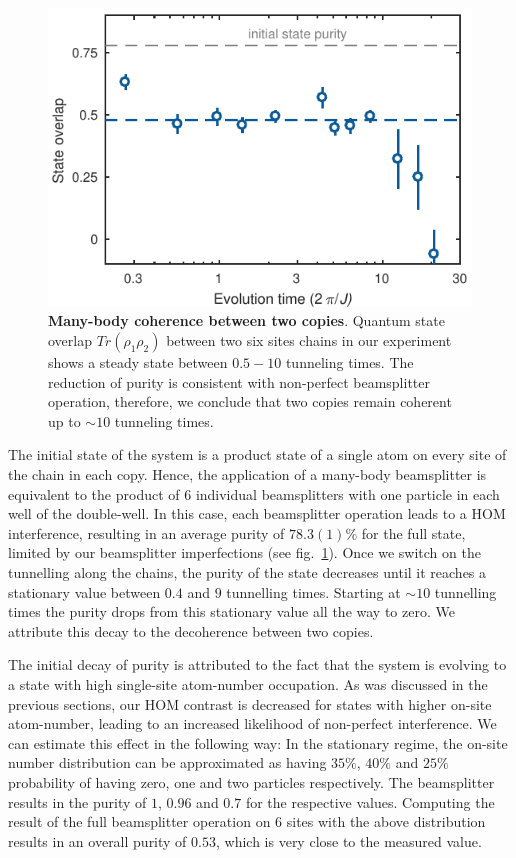 \begin{figure}[t]
	\centering
	\includegraphics[scale=1]{figures/CBH_MBP_single_trace.pdf}
	\caption{{\bf Many-body coherence between two copies}. Quantum state overlap $Tr(\rho_1 \rho_2) $ between two six sites chains in our experiment shows a steady state between $0.5-10$ tunneling times. The reduction of purity is consistent with non-perfect beamsplitter operation, therefore, we conclude that two copies remain coherent up to $\sim10$ tunneling times. }
	\label{fig:CBH_MBP_vs_time}
\end{figure}
\label{bs_imperfactions}
The initial state of the system is a product state of a single atom on every site of the chain in each copy. Hence, the application of a many-body beamsplitter is equivalent to the product of $6$ individual beamsplitters with one particle in each well of the double-well. In this case, each beamsplitter operation leads to a HOM interference, resulting in an average purity of $78.3(1)\%$ for the full state, limited by our beamsplitter imperfections (see fig.~\ref{fig:CBH_MBP_vs_time}). Once we switch on the tunnelling along the chains, the purity of the state decreases until it reaches a stationary value between $0.4$ and $ 9$ tunnelling times. Starting at $\sim 10$ tunnelling times the purity drops from this stationary value all the way to zero. We attribute this decay to the decoherence between two copies.

The initial decay of purity is attributed to the fact that the system is evolving to a state with high single-site atom-number occupation. As was discussed in the previous sections, our HOM contrast is decreased for states with higher on-site atom-number, leading to an increased likelihood of non-perfect interference. We can estimate this effect in the following way: In the stationary regime, the on-site number distribution can be approximated as having $35\%$, $40\%$ and $25\%$ probability of having zero, one and two particles respectively. The beamsplitter results in the purity of $1$, $0.96$ and $0.7$ for the respective values. Computing the result of the full beamsplitter operation on $6$ sites with the above distribution results in an overall purity of $0.53$, which is very close to the measured value.

